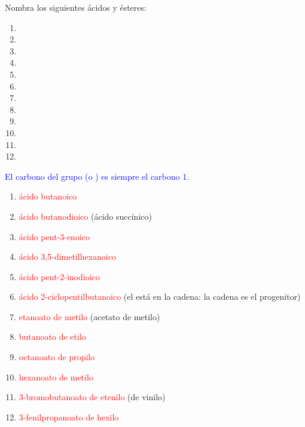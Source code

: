 \begin{exercise}
    Nombra los siguientes ácidos y ésteres:
    \begin{enumerate}[label=\alph*)]
        \item {}
        \item {}
        \item {}
        \item {}
        \item {}
        \item {}
        \item {}
        \item {}
        \item {}
        \item {}
        \item {}
        \item {}
    \end{enumerate}
    \begin{solu}
        \textcolor{blue}{El carbono del grupo  (o ) es siempre el carbono 1.}
        \begin{enumerate}[label=\alph*)]
            \item \textcolor{red}{ácido butanoico}
            \item \textcolor{red}{ácido butanodioico} (ácido succínico)
            \item \textcolor{red}{ácido pent-3-enoico}
            \item \textcolor{red}{ácido 3,5-dimetilhexanoico}
            \item \textcolor{red}{ácido pent-2-inodioico}
            \item \textcolor{red}{ácido 2-ciclopentilbutanoico} (el  está en la cadena: la cadena es el progenitor)
            \item \textcolor{red}{etanoato de metilo} (acetato de metilo)
            \item \textcolor{red}{butanoato de etilo}
            \item \textcolor{red}{octanoato de propilo}
            \item \textcolor{red}{hexanoato de metilo}
            \item \textcolor{red}{3-bromobutanoato de etenilo} (de vinilo)
            \item \textcolor{red}{3-fenilpropanoato de hexilo}
        \end{enumerate}
    \end{solu}
\end{exercise}

